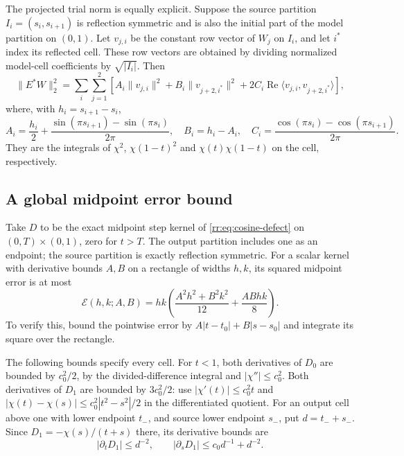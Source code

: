 The projected trial norm is equally explicit.  Suppose the source
partition $I_i=(s_i,s_{i+1})$ is reflection symmetric and is also the
initial part of the model partition on $(0,1)$.  Let $v_{j,i}$ be the
constant row vector of $W_j$ on $I_i$, and let $i^*$ index its reflected
cell.  These row vectors are obtained by dividing normalized model-cell
coefficients by $\sqrt{|I_i|}$.  Then
\begin{equation}\label{rr:eq:projected-trial-norm}
 \|E^*W\|_2^2=\sum_i\sum_{j=1}^2
 \left[A_i\|v_{j,i}\|^2+B_i\|v_{j+2,i^*}\|^2
       +2C_i\operatorname{Re}\langle v_{j,i},v_{j+2,i^*}\rangle\right],
\end{equation}
where, with $h_i=s_{i+1}-s_i$,
\[
 A_i=\frac{h_i}{2}+\frac{\sin(\pi s_{i+1})-\sin(\pi s_i)}{2\pi},
 \quad B_i=h_i-A_i,
 \quad C_i=\frac{\cos(\pi s_i)-\cos(\pi s_{i+1})}{2\pi}.
\]
They are the integrals of $\chi^2$, $\chi(1-t)^2$ and
$\chi(t)\chi(1-t)$ on the cell, respectively.

\subsection{A global midpoint error bound}

Take $D$ to be the exact midpoint step kernel of
\eqref{rr:eq:cosine-defect} on $(0,T)\times(0,1)$, zero for $t>T$.
The output partition includes one as an endpoint; the source partition
is exactly reflection symmetric.  For a scalar kernel with derivative
bounds $A,B$ on a rectangle of widths $h,k$, its squared midpoint error
is at most
\begin{equation}\label{rr:eq:midpoint-cell-bound}
 \mathcal E(h,k;A,B)
   =hk\left(\frac{A^2h^2+B^2k^2}{12}+\frac{ABhk}{8}\right).
\end{equation}
To verify this, bound the pointwise error by
$A|t-t_0|+B|s-s_0|$ and integrate its square over the rectangle.

The following bounds specify every cell.  For $t<1$, both derivatives
of $D_0$ are bounded by $c_0^2/2$, by the divided-difference integral
and $|\chi''|\le c_0^2$.  Both derivatives of $D_1$ are bounded by
$3c_0^2/2$: use
$|\chi'(t)|\le c_0^2t$ and
$|\chi(t)-\chi(s)|\le c_0^2|t^2-s^2|/2$ in the differentiated quotient.
For an output cell above one with lower endpoint $t_-$, and source
lower endpoint $s_-$, put $d=t_-+s_-$.  Since
$D_1=-\chi(s)/(t+s)$ there, its derivative bounds are
\[
 |\partial_tD_1|\le d^{-2},\qquad
 |\partial_sD_1|\le c_0d^{-1}+d^{-2}.
\]

